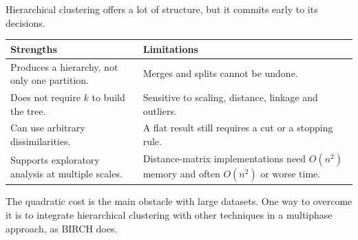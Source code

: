 Hierarchical clustering offers a lot of structure, but it commits early to its decisions.
\begin{center}
\begin{tabular}{@{}p{7cm}p{7cm}@{}}
\toprule
Strengths & Limitations \\
\midrule
Produces a hierarchy, not only one partition. & Merges and splits cannot be undone. \\
Does not require $k$ to build the tree. & Sensitive to scaling, distance, linkage and outliers. \\
Can use arbitrary dissimilarities. & A flat result still requires a cut or a stopping rule. \\
Supports exploratory analysis at multiple scales. & Distance-matrix implementations need $O(n^2)$ memory and often $O(n^2)$ or worse time. \\
\bottomrule
\end{tabular}
\end{center}
The quadratic cost is the main obstacle with large datasets. One way to overcome it is to integrate hierarchical clustering with other techniques in a multiphase approach, as BIRCH does.

